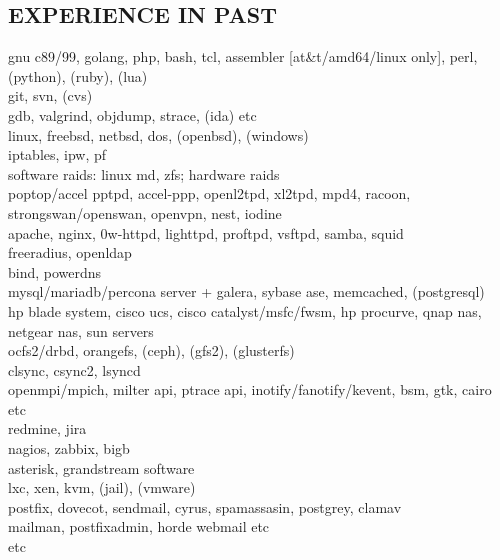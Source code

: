 \begin{resume}
\section{EXPERIENCE IN PAST}
\vspace{0.1in} 
    gnu c89/99, golang, php, bash, tcl, assembler [at\&t/amd64/linux only], perl, (python), (ruby), (lua)\\
    git, svn, (cvs)\\
    gdb, valgrind, objdump, strace, (ida) etc\\
    linux, freebsd, netbsd, dos, (openbsd), (windows)\\
    iptables, ipw, pf\\
    software raids: linux md, zfs; hardware raids\\
    poptop/accel pptpd, accel-ppp, openl2tpd, xl2tpd, mpd4, racoon, strongswan/openswan, openvpn, nest, iodine\\
    apache, nginx, 0w-httpd, lighttpd, proftpd, vsftpd, samba, squid\\
    freeradius, openldap\\
    bind, powerdns\\
    mysql/mariadb/percona server + galera, sybase ase, memcached, (postgresql)\\
    hp blade system, cisco ucs, cisco catalyst/msfc/fwsm, hp procurve, qnap nas, netgear nas, sun servers\\
    ocfs2/drbd, orangefs, (ceph), (gfs2), (glusterfs)\\
    clsync, csync2, lsyncd\\
    openmpi/mpich, milter api, ptrace api, inotify/fanotify/kevent, bsm, gtk, cairo etc\\
    redmine, jira\\
    nagios, zabbix, bigb\\
    asterisk, grandstream software\\
    lxc, xen, kvm, (jail), (vmware)\\
    postfix, dovecot, sendmail, cyrus, spamassasin, postgrey, clamav\\
    mailman, postfixadmin, horde webmail etc\\
    etc

\end{resume}
